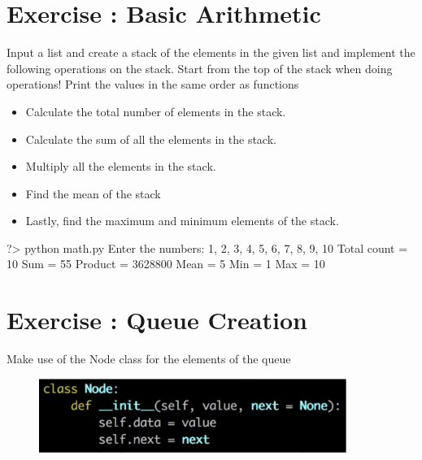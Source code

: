 \documentclass{42-en}
\begin{document}
\nextexercice

\chapter{Exercise \exercicenumber: Basic Arithmetic}

\exnumber{\exercicenumber}

\makeheaderfiles

Input a list and create a stack of the elements in the given list and implement the following operations on the stack. 
Start from the top of the stack when doing operations! Print the values in the same order as functions \\

		\begin{itemize}\itemsep1pt
			\item Calculate the total number of elements in the stack.
			\item Calculate the sum of all the elements in the stack.
			\item Multiply all the elements in the stack.
			\item Find the mean of the stack
			\item Lastly, find the maximum and minimum elements of the stack.
        	\end{itemize}
		
		\begin{42console}
			?> python math.py
			Enter the numbers: 1, 2, 3, 4, 5, 6, 7, 8, 9, 10
			Total count = 10
			Sum = 55
			Product = 3628800
			Mean = 5
			Min = 1
			Max = 10
		\end{42console}

\chapter{Exercise \exercicenumber: Queue Creation}

\exnumber{\exercicenumber}

\makeheaderfiles

Make use of the Node class for the elements of the queue\\
            	\begin{figure}[H]
                	\begin{center}
                    		\includegraphics[width=10cm]{images/listNode.png}
                	\end{center}
            	\end{figure}
\end{document}

